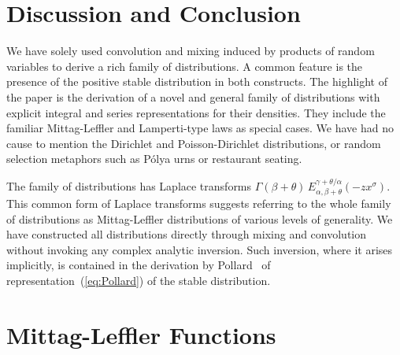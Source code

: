 \documentclass[a4paper,12pt]{article}
\begin{document}
{{{\section{Discussion and Conclusion}
\label{sec:discussion}

We have  solely used convolution and mixing induced  by products of random variables to derive a rich family of distributions.
A common feature  is the presence  of the positive stable distribution in  both constructs.
The highlight of the paper  is the derivation of  a novel and general family of distributions %
with explicit  integral and series representations for their  densities.  %
They include  the familiar Mittag-Leffler  and Lamperti-type laws as special cases.
 We  have had  no cause to mention the Dirichlet and Poisson-Dirichlet distributions, or random selection metaphors such as
  P{\' o}lya urns or restaurant seating.
 
The  family of distributions  has Laplace transforms
$\Gamma(\beta+\theta)\, E^{\gamma+\theta/\alpha}_{\alpha,\beta+\theta}(-z x^\sigma)$.
This common form of Laplace transforms suggests referring to the whole family of  distributions as Mittag-Leffler  distributions of various levels of generality.
We have constructed all distributions directly through mixing and convolution without invoking any complex analytic inversion.
Such inversion, where it arises implicitly, is  contained in the  derivation by Pollard~\cite{Pollard} of  representation~(\ref{eq:Pollard}) 
of the stable distribution.

\appendix
{}

\section{Mittag-Leffler Functions}
\label{sec:MLfunction}

}}}
\end{document}

